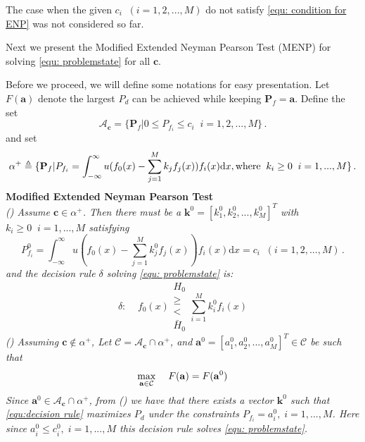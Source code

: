 The case when the given $c_i\;\; (i= 1, 2, ..., M)$ do not satisfy \eqref{equ: condition for ENP} was not considered so far. 


Next we present the Modified Extended Neyman Pearson Test (MENP) for solving \eqref{equ: problemstate} for all $\mathbf{c}$.

Before we proceed, we will define some notations for easy presentation.
Let $F(\mathbf{a})$ denote the largest $P_d$ can be achieved while keeping $\mathbf{P}_f = \mathbf{a}$. 
Define the set 
\[\mathcal{A}_\mathbf{c} = \{
  \mathbf{P}_f | 0 \leq P_{f_i} \leq c_i
  \;\;i=1, 2, ..., M\}\,.
\]
and set 
\[
\alpha^+ \triangleq \{\mathbf{P}_f | P_{f_i} = \int_{-\infty}^{\infty} u(f_0(x) - \sum_{j=1}^{M}k_j f_j(x)) f_i(x) \mathrm{d}x, \text{where\;\;} k_i \geq 0 \;\;i=1, ..., M\}\,.
\]
\noindent \textbf{Modified Extended Neyman Pearson Test}
\noindent \textit{
\\\textnormal{()} Assume $\mathbf{c} \in \alpha^+$. Then there must be a $\mathbf{k}^0 = [k_1^0, k_2^0, ..., k_M^0]^T$ with $k_i \geq 0\;\;i=1, ..., M$ satisfying
}
\begin{equation}
\label{equ:Pf}
  P_{f_i}^0 = \int_{-\infty}^{\infty} u(f_0(x) - \sum_{j=1}^{M}k_j^0f_j(x))f_i(x)\mathrm{d}x = c_i \;\; (i= 1, 2, ..., M)\,.
\end{equation}
\textit{
    and the decision rule $\delta $ solving  \eqref{equ: problemstate} is:
}
\begin{equation}
\label{equ:decision rule}
\delta:\;\;\;\;f_0(x) \substack{H_0 \\ \geq \\ < \\ \bar{H}_0} \sum_{i=1}^{M}k_i^0f_i(x)
\end{equation}
\textit{
\noindent \textnormal{()} Assuming $\mathbf{c} \notin \alpha^+$, Let $\mathcal{C} = \mathcal{A}_{\mathbf{c}} \cap \alpha^+$, and $\mathbf{a}^0 = [a_1^0, a_2^0, ..., a_M^0]^T \in \mathcal{C}$ be such that
}
\begin{equation}
\label{equ: F0}
\max_{\mathbf{a} \in \mathcal{C}}\;\;\;\;F(\mathbf{a}) = F(\mathbf{a}^0)\\
\end{equation}
\textit{
Since $\mathbf{a}^0 \in \mathcal{A}_{\mathbf{c}} \cap \alpha^+$, from \textnormal{()} we have that there exists a vector $\mathbf{k}^0$ such that \eqref{equ:decision rule}  maximizes $P_d$ under the constraints $P_{f_i} = a_i^0, \;i=1, ..., M$. Here since $a_i^0 \leq c_i^0, \;i=1, ..., M$ this decision rule  solves \eqref{equ: problemstate}.
}

